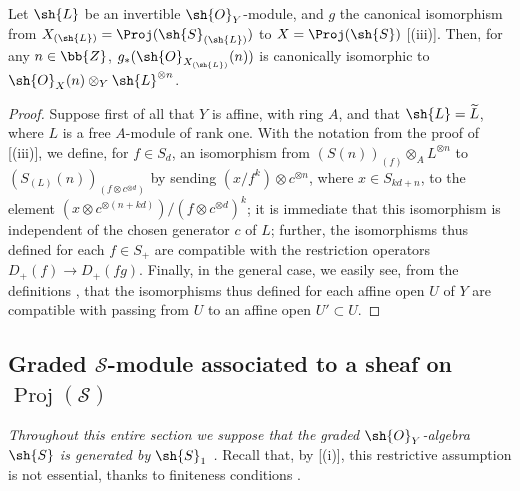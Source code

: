 \begin{proposition}[3.2.10]
\label{II.3.2.10}
Let $\sh{L}$ be an invertible $\sh{O}_Y$-module, and $g$ the canonical isomorphism from $X_{(\sh{L})}=\Proj(\sh{S}_{(\sh{L})})$ to $X=\Proj(\sh{S})$ [(iii)].
Then, for any $n\in\bb{Z}$, $g_*(\sh{O}_{X_{(\sh{L})}}(n))$ is canonically isomorphic to $\sh{O}_X(n)\otimes_Y\sh{L}^{\otimes n}$.
\end{proposition}

\begin{proof}
Suppose first of all that $Y$ is affine, with ring $A$, and that $\sh{L}=\widetilde{L}$, where $L$ is a free $A$-module of rank one.
With the notation from the proof of [(iii)], we define, for $f\in S_d$, an isomorphism from $(S(n))_{(f)}\otimes_A L^{\otimes n}$ to $(S_{(L)}(n))_{(f\otimes c^{\otimes d})}$ by sending $(x/f^k)\otimes c^{\otimes n}$, where $x\in S_{kd+n}$, to the element $(x\otimes c^{\otimes(n+kd)})/(f\otimes c^{\otimes d})^k$;
it is immediate that this isomorphism is independent of the chosen generator $c$ of $L$;
further, the isomorphisms thus defined for each $f\in S_+$ are compatible with the restriction operators $D_+(f)\to D_+(fg)$.
Finally, in the general case, we easily see, from the definitions , that the isomorphisms thus defined for each affine open $U$ of $Y$ are compatible with passing from $U$ to an affine open $U'\subset U$.
\end{proof}


\subsection{Graded $\mathcal{S}$-module associated to a sheaf on $\operatorname{Proj}(\mathcal{S})$}
\label{subsection:II.3.3}

\emph{Throughout this entire section we suppose that the graded $\sh{O}_Y$-algebra $\sh{S}$ is generated by $\sh{S}_1$ .}
Recall that, by [(i)], this restrictive assumption is not essential, thanks to finiteness conditions .


